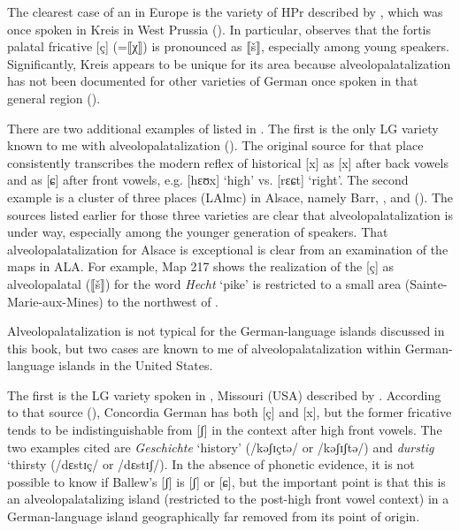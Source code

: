 \begin{xlist}
The clearest case of an  in Europe is the variety of HPr described by \citet{Kuck1933}, which was once spoken in Kreis  in West Prussia (). In particular, \citet[148]{Kuck1933} observes that the fortis palatal fricative [ç] (=⟦χ⟧) is pronounced as ⟦š⟧, especially among young speakers. Significantly, Kreis  appears to be unique for its area because alveolopalatalization has not been documented for other varieties of German once spoken in that general region ().

There are two additional examples of  listed in . The first is the only LG variety known to me with alveolopalatalization (). The original source for that place \citep{Darski1973} consistently transcribes the modern reflex of historical [x] as [x] after back vowels and as [ɕ] after front vowels, e.g. [hɛʊx] ‘high’ vs. [rɛɕt] ‘right’. The second example is a cluster of three places (LAlmc) in Alsace, namely Barr, , and  (). The sources listed earlier for those three varieties are clear that alveolopalatalization is under way, especially among the younger generation of speakers.  That alveolopalatalization for Alsace is exceptional is clear from an examination of the maps in ALA. For example, Map 217 shows the realization of the  [ç] as alveolopalatal (⟦š⟧) for the word \textit{Hecht} ‘pike’ is restricted to a small area (Sainte-Marie-aux-Mines) to the northwest of .

Alveolopalatalization is not typical for the German-language islands discussed in this book, but two cases are known to me of alveolopalatalization within German-language islands in the United States. 

The first is the LG variety spoken in , Missouri (USA) described by \citet{Ballew1997}. According to that source (\citealt[57]{Ballew1997}), Concordia German has both [ç] and [x], but the former fricative tends to be indistinguishable from [ʃ] in the context after high front vowels. The two examples cited are \textit{Geschichte} ‘history’ (/kəʃɪçtə/ or /kəʃɪʃtə/) and \textit{durstig} ‘thirsty (/dɛstɪç/ or /dɛstɪʃ/). In the absence of phonetic evidence, it is not possible to know if Ballew’s [ʃ] is [ʃ] or [ɕ], but the important point is that this is an alveolopalatalizing island (restricted to the post-high front vowel context) in a German-language island geographically far removed from its point of origin. 


\end{xlist}
